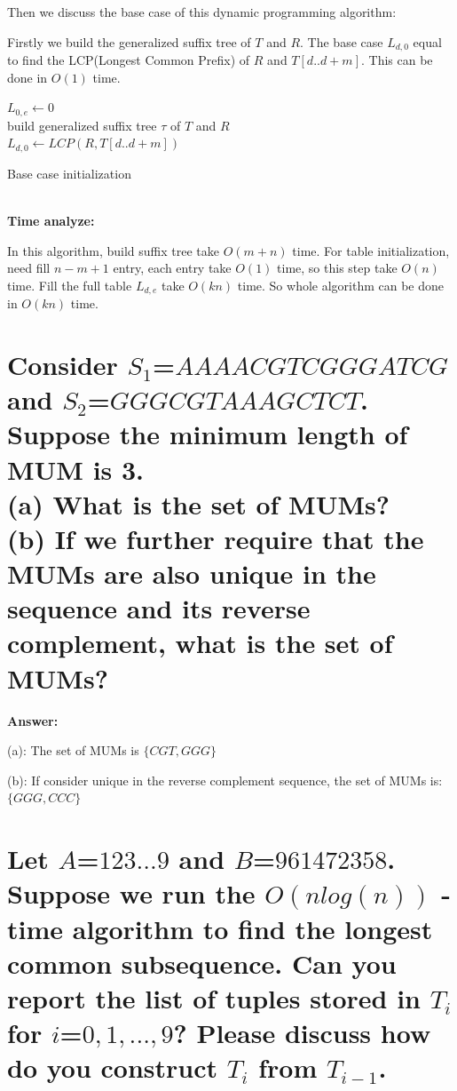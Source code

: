 \documentclass{article}
\begin{document}
Then we discuss the base case of this dynamic programming algorithm:

Firstly we build the generalized suffix tree of $T$ and $R$.
The base case $L_{d,0}$ equal to find the LCP(Longest Common Prefix) of $R$ and $T[d..d+m]$.
This can be done in $O(1)$ time.

\begin{algorithm}[H]

     {
        $L_{0, e} \leftarrow 0$ \\
        build generalized suffix tree $\tau$ of $T$ and $R$ \\
         {
            $L_{d,0} \leftarrow LCP(R, T[d..d+m])$
        }
    }

    \caption{Base case initialization}
\end{algorithm}

\ \\

\noindent
\textbf{Time analyze:}

In this algorithm, build suffix tree take $O(m+n)$ time.
For table initialization, need fill $n-m+1$ entry, each entry take $O(1)$ time,
so this step take $O(n)$ time. 
Fill the full table $L_{d,e}$ take $O(kn)$ time.
So whole algorithm can be done in $O(kn)$ time.

\section{Consider $S_1$=$AAAACGTCGGGATCG$ and $S_2$=$GGGCGTAAAGCTCT$.
Suppose the minimum length of MUM is 3. \\
(a) What is the set of MUMs? \\
(b) If we further require that the MUMs are also unique in the sequence
and its reverse complement, what is the set of MUMs?
}

\large{\textbf{Answer:}}

(a): The set of MUMs is $\{CGT, GGG\}$

(b): If consider unique in the reverse complement sequence, the set of MUMs is:
$\{GGG, CCC\}$

\section{Let $A$=$1 2 3 ... 9$ and $B$=$9 6 1 4 7 2 3 5 8$. Suppose we run the $O(n log(n))$ -
time algorithm to find the longest common subsequence. Can you report the
list of tuples stored in $T_i$ for $i$=$0, 1, ..., 9$? Please discuss how do you construct
$T_i$ from $T_{i-1}$.
}
\end{document}
